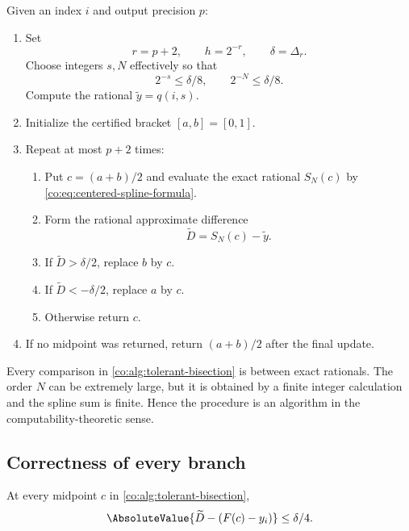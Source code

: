 \begin{algorithm}\label{co:alg:tolerant-bisection}
Given an index $i$ and output precision $p$:
\begin{enumerate}
\item Set
\[
 r=p+2,
 \qquad h=2^{-r},
 \qquad \delta=\Delta_r.
\]
Choose integers $s,N$ effectively so that
\begin{equation}\label{co:eq:oracle-precisions}
 2^{-s}\le\delta/8,
 \qquad 2^{-N}\le\delta/8.
\end{equation}
Compute the rational $\widetilde y=q(i,s)$.
\item Initialize the certified bracket $[a,b]=[0,1]$.
\item Repeat at most $p+2$ times:
  \begin{enumerate}
  \item Put $c=(a+b)/2$ and evaluate the exact rational $S_N(c)$ by
        \eqref{co:eq:centered-spline-formula}.
  \item Form the rational approximate difference
        \begin{equation}\label{co:eq:D-tilde}
         \widetilde D=S_N(c)-\widetilde y.
        \end{equation}
  \item If $\widetilde D>\delta/2$, replace $b$ by $c$.
  \item If $\widetilde D<-\delta/2$, replace $a$ by $c$.
  \item Otherwise return $c$.
  \end{enumerate}
\item If no midpoint was returned, return $(a+b)/2$ after the final update.
\end{enumerate}
\end{algorithm}

Every comparison in \cref{co:alg:tolerant-bisection} is between exact rationals.
The order $N$ can be extremely large, but it is obtained by a finite integer
calculation and the spline sum is finite.  Hence the procedure is an algorithm
in the computability-theoretic sense.

\subsection{Correctness of every branch}

\begin{lemma}\label{co:lem:difference-certificate}
At every midpoint $c$ in \cref{co:alg:tolerant-bisection},
\begin{equation}\label{co:eq:difference-certificate}
 \AbsoluteValue{\widetilde D-(F(c)-y_i)}\le\delta/4.
\end{equation}
\end{lemma}

